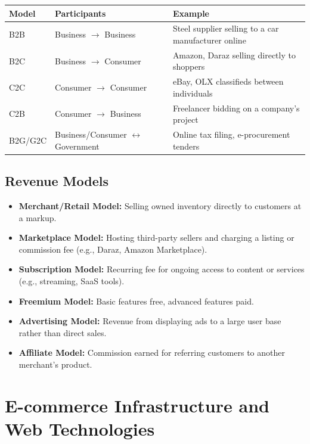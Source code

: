 \documentclass[11pt,a4paper]{article}
\begin{document}
\begin{center}
\begin{tabular}{@{}p{1.6cm}p{4.6cm}p{6.6cm}@{}}
\toprule
\rowcolor{primary!15}
\textbf{Model} & \textbf{Participants} & \textbf{Example} \\
\midrule
B2B & Business $\to$ Business & Steel supplier selling to a car manufacturer online \\
B2C & Business $\to$ Consumer & Amazon, Daraz selling directly to shoppers \\
C2C & Consumer $\to$ Consumer & eBay, OLX classifieds between individuals \\
C2B & Consumer $\to$ Business & Freelancer bidding on a company's project \\
B2G/G2C & Business/Consumer $\leftrightarrow$ Government & Online tax filing, e-procurement tenders \\
\bottomrule
\end{tabular}
\end{center}

\subsection{Revenue Models}
\begin{conceptbox}
\begin{itemize}[leftmargin=*]
  \item \textbf{Merchant/Retail Model:} Selling owned inventory directly to customers at a markup.
  \item \textbf{Marketplace Model:} Hosting third-party sellers and charging a listing or commission fee (e.g., Daraz, Amazon Marketplace).
  \item \textbf{Subscription Model:} Recurring fee for ongoing access to content or services (e.g., streaming, SaaS tools).
  \item \textbf{Freemium Model:} Basic features free, advanced features paid.
  \item \textbf{Advertising Model:} Revenue from displaying ads to a large user base rather than direct sales.
  \item \textbf{Affiliate Model:} Commission earned for referring customers to another merchant's product.
\end{itemize}
\end{conceptbox}

\section{E-commerce Infrastructure and Web Technologies}
\end{document}
